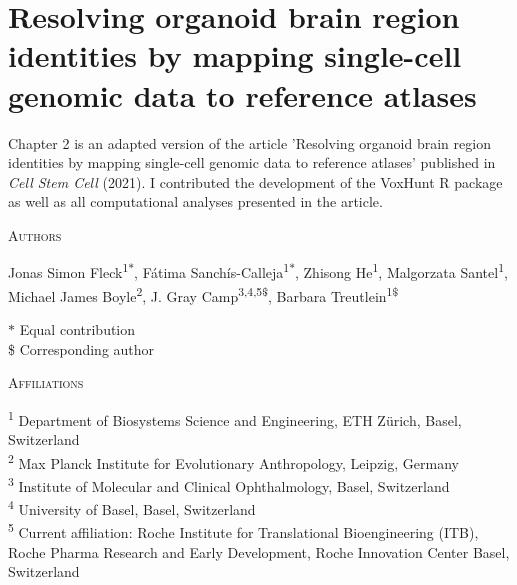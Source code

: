 \thispagestyle{plain}
\section{Resolving organoid brain region identities by mapping single-cell genomic data to reference atlases}

\vspace{0.5cm}

Chapter 2 is an adapted version of the article 'Resolving organoid brain region identities by mapping single-cell genomic data to reference atlases' published in \textit{Cell Stem Cell} (2021). I contributed the development of the VoxHunt R package as well as all computational analyses presented in the article.

\vspace{1cm}

\noindent
{\large\textsc{Authors}}

\noindent
Jonas Simon Fleck\textsuperscript{1$*$}, 
Fátima Sanchís-Calleja\textsuperscript{1$*$}, 
Zhisong He\textsuperscript{1}, 
Malgorzata Santel\textsuperscript{1}, 
Michael James Boyle\textsuperscript{2}, 
J. Gray Camp\textsuperscript{3,4,5\$}, 
Barbara Treutlein\textsuperscript{1\$}

\vspace{0.5cm}

\noindent
$\ast$ Equal contribution\\
\$ Corresponding author

\vspace{1cm}

\noindent
{\large\textsc{Affiliations}}

\noindent
\textsuperscript{1} Department of Biosystems Science and Engineering, ETH Zürich, Basel, Switzerland\\
\textsuperscript{2} Max Planck Institute for Evolutionary Anthropology, Leipzig, Germany\\
\textsuperscript{3} Institute of Molecular and Clinical Ophthalmology, Basel, Switzerland\\
\textsuperscript{4} University of Basel, Basel, Switzerland\\
\textsuperscript{5} Current affiliation: Roche Institute for Translational Bioengineering (ITB), Roche Pharma Research and Early Development, Roche Innovation Center Basel, Switzerland

\vspace{1cm}

